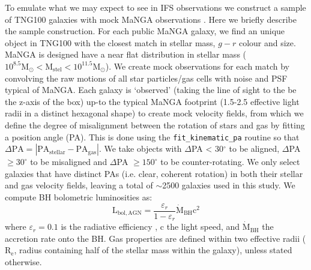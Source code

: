 \documentclass[fleqn,usenatbib]{mnras}
\begin{document}
To emulate what we may expect to see in IFS observations we construct a sample of TNG100 galaxies with mock MaNGA observations \citep[a complete description is given in][]{duckworth2020}. Here we briefly describe the sample construction. 
For each public MaNGA galaxy, we find an unique object in TNG100 with the closest match in stellar mass, $g-r$ colour and size. MaNGA is designed have a near flat distribution in stellar mass ($\mathrm{10^{8.5} M_{\odot} < M_{stel} < 10^{11.5} M_{\odot}}$). We create mock observations for each match by convolving the raw motions of all star particles/gas cells with noise and PSF typical of MaNGA. Each galaxy is `observed' (taking the line of sight to the be the z-axis of the box) up-to the typical MaNGA footprint (1.5-2.5 effective light radii in a distinct hexagonal shape) to create mock velocity fields, from which we define the degree of misalignment between the rotation of stars and gas by fitting a position angle (PA). This is done using the \texttt{fit\_kinematic\_pa} routine \citep[see Appendix C of][]{krajnovic2006} so that $\Delta\mathrm{PA = |PA_{stellar} - PA_{gas}|}$. We take objects with $\Delta$PA < 30$^{\circ}$ to be aligned, $\Delta$PA $ \geq 30^{\circ}$ to be misaligned and $\Delta$PA $\geq 150^{\circ}$ to be counter-rotating. We only select galaxies that have distinct PAs (i.e. clear, coherent rotation) in both their stellar and gas velocity fields, leaving a total of $\sim$2500 galaxies used in this study. We compute BH bolometric luminosities as:
\begin{equation}
\mathrm{L_{bol, AGN}} = \frac{\varepsilon_r}{1 - \varepsilon_r} \dot{\mathrm{M}}_{\mathrm{BH}} \mathrm{c^2}
\end{equation}
where $\varepsilon_r=0.1$ is the radiative efficiency \citep[see discussion in][]{habouzit2019}, c the light speed, and $\dot{\mathrm{M}}_{\mathrm{BH}}$ the accretion rate onto the BH. Gas properties are defined within two effective radii ($\mathrm{R_{e}}$, radius containing half of the stellar mass within the galaxy), unless stated otherwise.

\vspace{-1em}
\end{document}
